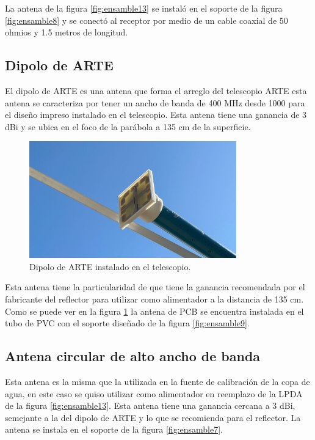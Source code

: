 La antena de la figura \ref{fig:ensamble13} se instaló en el soporte de la figura \ref{fig:ensamble8} y se conectó al receptor por medio de un cable coaxial de 50 ohmios y 1.5 metros de longitud.\\

\subsection{Dipolo de ARTE}

El dipolo de ARTE es una antena que forma el arreglo del telescopio ARTE \cite{Gallardo2023} esta antena se caracteriza por tener un ancho de banda de 400 MHz desde 1000 para el diseño impreso instalado en el telescopio. Esta antena tiene una ganancia de 3 dBi y se ubica en el foco de la parábola a 135 cm de la superficie.\\

\begin{figure}
    \centering
    \includegraphics[width=0.8\textwidth]{img/feed}
    \caption{Dipolo de ARTE instalado en el telescopio.}
    \label{fig:ensamble14}
\end{figure}

Esta antena tiene la particularidad de que tiene la ganancia recomendada por el fabricante del reflector para utilizar como alimentador a la distancia de 135 cm. Como se puede ver en la figura \ref{fig:ensamble14} la antena de PCB se encuentra instalada en el tubo de PVC con el soporte diseñado de la figura \ref{fig:ensamble9}.\\

\subsection{Antena circular de alto ancho de banda}

Esta antena es la misma que la utilizada en la fuente de calibración de la copa de agua, en este caso se quiso utilizar como alimentador en reemplazo de la LPDA de la figura \ref{fig:ensamble13}. Esta antena tiene una ganancia cercana a 3 dBi, semejante a la del dipolo de ARTE y lo que se recomienda para el reflector. La antena se instala en el soporte de la figura \ref{fig:ensamble7}.\\

